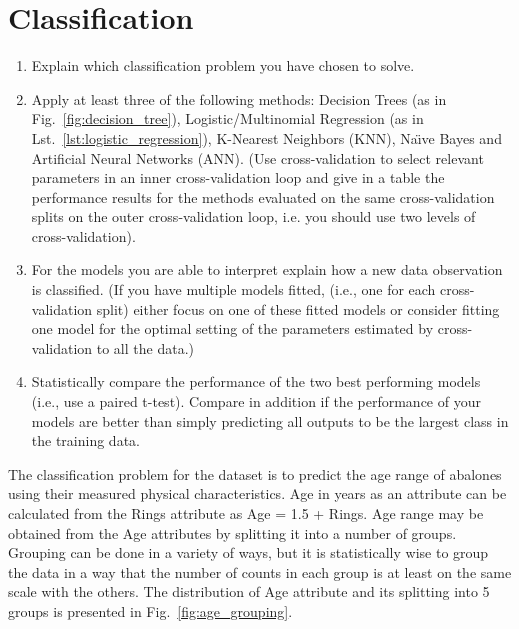 \documentclass[10pt, paper=a4]{article}
\begin{document}
\section{Classification}
\label{sec:classification}

\begin{enumerate}
\item Explain which classification problem you have chosen to solve.
\item Apply at least three of the following methods: Decision Trees
  (as in Fig.~\ref{fig:decision_tree}), Logistic/Multinomial
  Regression (as in Lst.~\ref{lst:logistic_regression}), K-Nearest
  Neighbors (KNN), Naı̈ve Bayes and Artificial Neural Networks (ANN).
  (Use cross-validation to select relevant parameters in an inner
  cross-validation loop and give in a table the performance results
  for the methods evaluated on the same cross-validation splits on the
  outer cross-validation loop, i.e. you should use two levels of
  cross-validation).
\item For the models you are able to interpret explain how a new data
  observation is classified.  (If you have multiple models fitted,
  (i.e., one for each cross-validation split) either focus on one of
  these fitted models or consider fitting one model for the optimal
  setting of the parameters estimated by cross-validation to all the
  data.)
\item Statistically compare the performance of the two best performing
  models (i.e., use a paired t-test). Compare in addition if the
  performance of your models are better than simply predicting all
  outputs to be the largest class in the training data.
\end{enumerate}


The classification problem for the dataset is to predict the age range
of abalones using their measured physical characteristics.  Age in
years as an attribute can be calculated from the Rings attribute as
Age = 1.5 + Rings.  Age range may be obtained from the Age attributes
by splitting it into a number of groups.  Grouping can be done in a
variety of ways, but it is statistically wise to group the data in a
way that the number of counts in each group is at least on the same
scale with the others.  The distribution of Age attribute and its
splitting into 5 groups is presented in Fig.~\ref{fig:age_grouping}.
\end{document}
